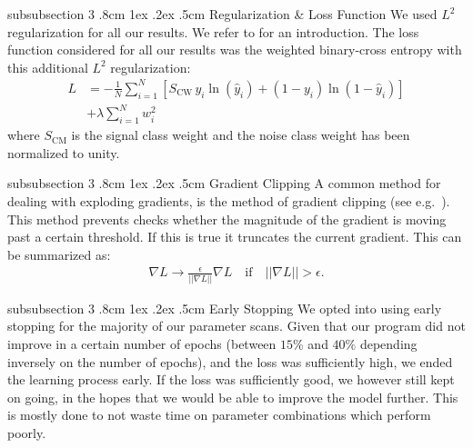 \documentclass[%
reprint,
amsmath,amssymb,
aps,
]{revtex4-2}
\makeatletter
\renewcommand{\subsubsection}{%
	\@startsection
	{subsubsection}%
	{3}%
	{\z@}%
	{.8cm \@plus1ex \@minus .2ex}%
	{.5cm}%
	{\normalfont\small\centering}%
}
\makeatother
\begin{document}
\subsubsection{Regularization \& Loss Function}
We used $L^2$ regularization for all our results. We refer to \cite{project1} for an introduction. The loss function considered for all our results was the weighted binary-cross entropy with this additional $L^2$ regularization:
\begin{align}	
	L&=-\frac1N\sum_{i=1}^N\left[S_\text{CW}\,y_i\ln(\hat{y}_i)+(1-y_i)\ln(1-\hat{y}_i)\right]\nonumber\\
	&+\lambda\sum_{i=1}^Nw_i^2 \label{eq:L2_paramater}
\end{align}
where $S_{\text{CM}}$ is the signal class weight and the noise class weight has been normalized to unity.

\subsubsection{Gradient Clipping}
A common method for dealing with exploding gradients, is the method of gradient clipping (see e.g.~\cite{Goodfellow-et-al-2016}). This method prevents checks whether the magnitude of the gradient is moving past a certain threshold. If this is true it truncates the current gradient. This can be summarized as:
\begin{align}	\label{eq:clipping}
	\nabla L \rightarrow \frac{\epsilon}{||\nabla L||}\nabla L\quad\text{if}\quad||\nabla L|| > \epsilon.
\end{align}

\subsubsection{Early Stopping}
We opted into using early stopping for the majority of our parameter scans. Given that our program did not improve in a certain number of epochs (between $15\%$ and $40\%$ depending inversely on the number of epochs), and the loss was sufficiently high, we ended the learning process early. If the loss was sufficiently good, we however still kept on going, in the hopes that we would be able to improve the model further. This is mostly done to not waste time on parameter combinations which perform poorly. 
\end{document}
